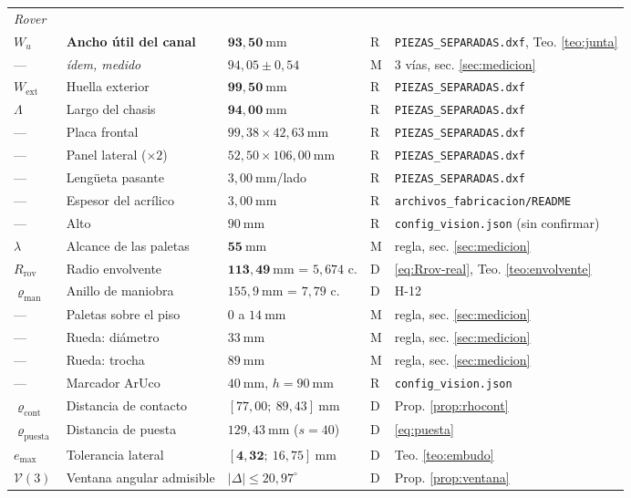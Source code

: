 \documentclass[11pt,a4paper]{article}
\theoremstyle{definition}
\newcommand{\grados}{^{\circ}}
\begin{document}
\begin{table}[htbp]
\begin{tabular}{llllp{4.2cm}}
\midrule
\multicolumn{5}{l}{\textit{Rover}}\\
$W_u$ & \textbf{Ancho útil del canal} & $\mathbf{93{,}50\ \mathrm{mm}}$ & R & \texttt{PIEZAS\_SEPARADAS.dxf}, Teo. \ref{teo:junta} \\
--- & \emph{ídem, medido} & $94{,}05 \pm 0{,}54$ & M & 3 vías, sec. \ref{sec:medicion} \\
$W_{\mathrm{ext}}$ & Huella exterior & $\mathbf{99{,}50\ \mathrm{mm}}$ & R & \texttt{PIEZAS\_SEPARADAS.dxf} \\
$\Lambda$ & Largo del chasis & $\mathbf{94{,}00\ \mathrm{mm}}$ & R & \texttt{PIEZAS\_SEPARADAS.dxf} \\
--- & Placa frontal & $99{,}38 \times 42{,}63\ \mathrm{mm}$ & R & \texttt{PIEZAS\_SEPARADAS.dxf} \\
--- & Panel lateral (${\times}2$) & $52{,}50 \times 106{,}00\ \mathrm{mm}$ & R & \texttt{PIEZAS\_SEPARADAS.dxf} \\
--- & Lengüeta pasante & $3{,}00\ \mathrm{mm}$/lado & R & \texttt{PIEZAS\_SEPARADAS.dxf} \\
--- & Espesor del acrílico & $3{,}00\ \mathrm{mm}$ & R & \texttt{archivos\_fabricacion/README} \\
--- & Alto & $90\ \mathrm{mm}$ & R & \texttt{config\_vision.json} (sin confirmar) \\
$\lambda$ & Alcance de las paletas & $\mathbf{55\ \mathrm{mm}}$ & M & regla, sec. \ref{sec:medicion} \\
$R_{\mathrm{rov}}$ & Radio envolvente & $\mathbf{113{,}49\ \mathrm{mm}}$ = $5{,}674$ c. & D & \eqref{eq:Rrov-real}, Teo. \ref{teo:envolvente} \\
$\varrho_{\mathrm{man}}$ & Anillo de maniobra & $155{,}9\ \mathrm{mm}$ = $7{,}79$ c. & D & H-12 \\
--- & Paletas sobre el piso & $0$ a $14\ \mathrm{mm}$ & M & regla, sec. \ref{sec:medicion} \\
--- & Rueda: diámetro & $33\ \mathrm{mm}$ & M & regla, sec. \ref{sec:medicion} \\
--- & Rueda: trocha & $89\ \mathrm{mm}$ & M & regla, sec. \ref{sec:medicion} \\
--- & Marcador ArUco & $40\ \mathrm{mm}$, $h=90\ \mathrm{mm}$ & R & \texttt{config\_vision.json} \\
$\varrho_{\mathrm{cont}}$ & Distancia de contacto & $[77{,}00;\ 89{,}43]\ \mathrm{mm}$ & D & Prop. \ref{prop:rhocont} \\
$\varrho_{\mathrm{puesta}}$ & Distancia de puesta & $129{,}43\ \mathrm{mm}$ ($s=40$) & D & \eqref{eq:puesta} \\
$e_{\max}$ & Tolerancia lateral & $[\mathbf{4{,}32};\ 16{,}75]\ \mathrm{mm}$ & D & Teo. \ref{teo:embudo} \\
$\mathcal V(3)$ & Ventana angular admisible & $|\Delta| \le 20{,}97\grados$ & D & Prop. \ref{prop:ventana} \\


\end{tabular}
\end{table}
\end{document}
